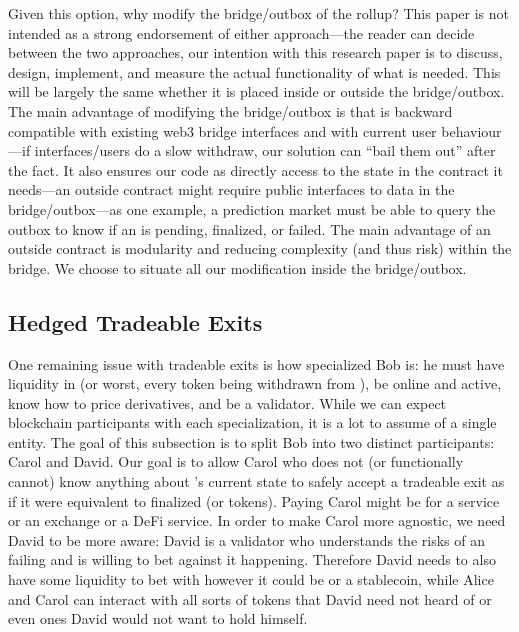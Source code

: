 Given this option, why modify the bridge/outbox of the rollup? This paper is not intended as a strong endorsement of either approach---the reader can decide between the two approaches, our intention with this research paper is to discuss, design, implement, and measure the actual functionality of what is needed. This will be largely the same whether it is placed inside or outside the bridge/outbox. The main advantage of modifying the bridge/outbox is that is backward compatible with existing web3 bridge interfaces and with current user behaviour---if interfaces/users do a slow withdraw, our solution can ``bail them out'' after the fact. It also ensures our code as directly access to the state in the contract it needs---an outside contract might require public interfaces to data in the bridge/outbox---as one example, a prediction market must be able to query the outbox to know if an \rblock is pending, finalized, or failed. The main advantage of an outside contract is modularity and reducing complexity (and thus risk) within the bridge. We choose to situate all our modification inside the bridge/outbox.

\subsection{Hedged Tradeable Exits}
\label{sec:PM}

One remaining issue with tradeable exits is how specialized Bob is: he must have liquidity in \ethone (or worst, every token being withdrawn from \layertwo), be online and active, know how to price derivatives, and be a \layertwo validator. While we can expect blockchain participants with each specialization, it is a lot to assume of a single entity. The goal of this subsection is to split Bob into two distinct participants: Carol and David. Our goal is to allow Carol who does not (or functionally cannot) know anything about \layertwo's current state to safely accept a tradeable exit as if it were equivalent to finalized \ethone (or \layerone tokens). Paying Carol might be for a service or an exchange or a DeFi service. In order to make Carol more agnostic, we need David to be more aware: David is a \layertwo validator who understands the risks of an \rblock failing and is willing to bet against it happening. Therefore David needs to also have some liquidity to bet with however it could be \ethone or a stablecoin, while Alice and Carol can interact with all sorts of tokens that David need not heard of or even ones David would not want to hold himself. 

